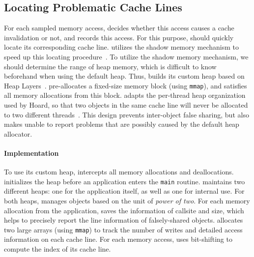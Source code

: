 \subsection{Locating Problematic Cache Lines}
\label{sec:shadow}

For each sampled memory access, \cheetah{} decides whether this access causes a cache invalidation or not, and records this access. For this purpose, \cheetah{} should quickly locate its corresponding cache line. \Cheetah{} utilizes the shadow memory mechanism to speed up this locating procedure~\cite{qinzhao, Predator}. 
To utilize the shadow memory mechanism, we should determine the range of heap memory, which is difficult to know beforehand when using the default heap. Thus, \cheetah{} builds its custom heap based on Heap Layers~\cite{Berger:2001:CHM:378795.378821}. \cheetah{} pre-allocates a fixed-size memory block (using \texttt{mmap}), and satisfies all memory allocations from this block. \cheetah{} adapts the per-thread heap organization used by Hoard, so that two objects in the same cache line will never be allocated to two different threads~\cite{Hoard}. This design prevents inter-object false sharing, but also makes \cheetah{} unable to report problems that are possibly caused by the default heap allocator.  

\paragraph{Implementation} 
To use its custom heap, \cheetah{} intercepts all memory allocations and deallocations. \cheetah{} initializes the heap before an application enters the \texttt{main} routine. \cheetah{} maintains two different heaps: one for the application itself, as well as one for internal use. For both heaps, \cheetah{} manages objects based on the unit of {\it power of two}. For each memory allocation from the application, \cheetah{} saves the information of callsite and size, which helps \cheetah{} to precisely report the line information of falsely-shared objects.  
\Cheetah{} allocates two large arrays (using \texttt{mmap}) to track the number of writes and detailed access information on each cache line. For each memory access, \cheetah{} uses bit-shifting to compute the index of its cache line. 


